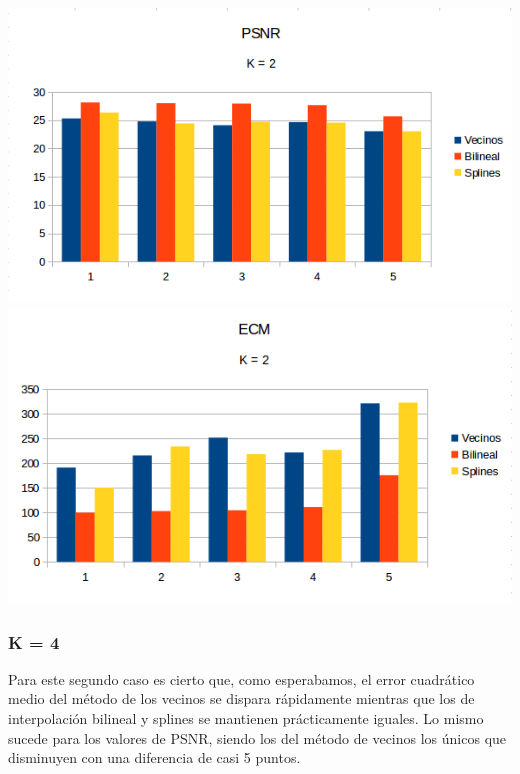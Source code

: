 \begin{center}
\includegraphics[scale=0.50]{imagenes/K2PSNR.png}
\includegraphics[scale=0.50]{imagenes/K2ECM.png}
\end{center}

\subsubsection{K = 4}
Para este segundo caso es cierto que, como esperabamos, el error cuadrático medio del método de los vecinos se dispara rápidamente mientras que los de interpolación bilineal y splines se mantienen prácticamente iguales. Lo mismo sucede para los valores de PSNR, siendo los del método de vecinos los únicos que disminuyen con una diferencia de casi 5 puntos.

